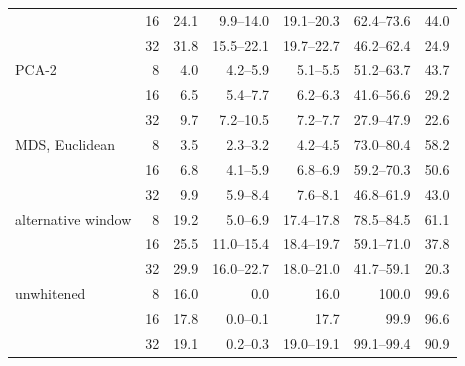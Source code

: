 \begin{tabular}{lrrrrrr}
 & 16 & 24.1 & 9.9--14.0 & 19.1--20.3 & 62.4--73.6 & 44.0 \\
 & 32 & 31.8 & 15.5--22.1 & 19.7--22.7 & 46.2--62.4 & 24.9 \\
\addlinespace
PCA-2 & 8 & 4.0 & 4.2--5.9 & 5.1--5.5 & 51.2--63.7 & 43.7 \\
 & 16 & 6.5 & 5.4--7.7 & 6.2--6.3 & 41.6--56.6 & 29.2 \\
 & 32 & 9.7 & 7.2--10.5 & 7.2--7.7 & 27.9--47.9 & 22.6 \\
\addlinespace
MDS, Euclidean & 8 & 3.5 & 2.3--3.2 & 4.2--4.5 & 73.0--80.4 & 58.2 \\
 & 16 & 6.8 & 4.1--5.9 & 6.8--6.9 & 59.2--70.3 & 50.6 \\
 & 32 & 9.9 & 5.9--8.4 & 7.6--8.1 & 46.8--61.9 & 43.0 \\
\addlinespace
alternative window & 8 & 19.2 & 5.0--6.9 & 17.4--17.8 & 78.5--84.5 & 61.1 \\
 & 16 & 25.5 & 11.0--15.4 & 18.4--19.7 & 59.1--71.0 & 37.8 \\
 & 32 & 29.9 & 16.0--22.7 & 18.0--21.0 & 41.7--59.1 & 20.3 \\
\addlinespace
unwhitened & 8 & 16.0 & 0.0 & 16.0 & 100.0 & 99.6 \\
 & 16 & 17.8 & 0.0--0.1 & 17.7 & 99.9 & 96.6 \\
 & 32 & 19.1 & 0.2--0.3 & 19.0--19.1 & 99.1--99.4 & 90.9 \\
\bottomrule
\end{tabular}
